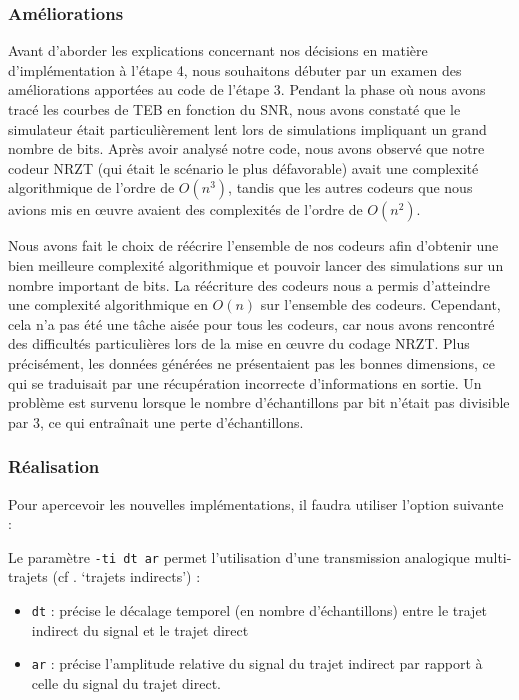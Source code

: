 \subsubsection{Améliorations}

Avant d'aborder les explications concernant nos décisions en matière d'implémentation à l'étape 4, nous souhaitons débuter par un examen des améliorations apportées au code de l'étape 3. Pendant la phase où nous avons tracé les courbes de TEB en fonction du SNR, nous avons constaté que le simulateur était particulièrement lent lors de simulations impliquant un grand nombre de bits. Après avoir analysé notre code, nous avons observé que notre codeur NRZT (qui était le scénario le plus défavorable) avait une complexité algorithmique de l'ordre de $O(n^{3})$, tandis que les autres codeurs que nous avions mis en œuvre avaient des complexités de l'ordre de $O(n^{2})$.

Nous avons fait le choix de réécrire l'ensemble de nos codeurs afin d'obtenir une bien meilleure complexité algorithmique et pouvoir lancer des simulations sur un nombre important de bits. La réécriture des codeurs nous a permis d'atteindre une complexité algorithmique en $O(n)$ sur l'ensemble des codeurs. Cependant, cela n'a pas été une tâche aisée pour tous les codeurs, car nous avons rencontré des difficultés particulières lors de la mise en œuvre du codage NRZT. Plus précisément, les données générées ne présentaient pas les bonnes dimensions, ce qui se traduisait par une récupération incorrecte d'informations en sortie. Un problème est survenu lorsque le nombre d'échantillons par bit n'était pas divisible par 3, ce qui entraînait une perte d'échantillons.

\subsubsection{Réalisation}

\vspace{0,5cm}
Pour apercevoir les nouvelles implémentations, il faudra utiliser l'option suivante :

Le paramètre \texttt{-ti dt ar} permet l'utilisation d’une transmission analogique multi-trajets (cf . ‘trajets indirects’) :
     \begin{itemize}
        \item \texttt{dt} : précise le décalage temporel (en nombre d’échantillons) entre le trajet indirect du signal et le trajet direct
        \item \texttt{ar} : précise l’amplitude relative du signal du trajet indirect par rapport à celle du signal du trajet direct.
    \end{itemize}

